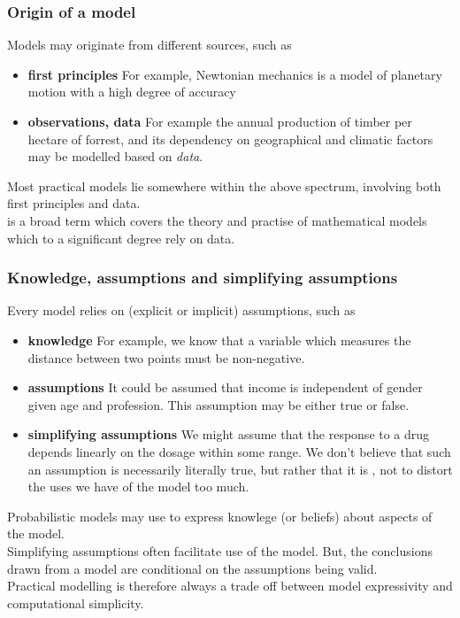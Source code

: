 \begin{frame}
\frametitle{Origin of a model}

Models may originate from different sources, such as
\begin{itemize}
\item {\bf first principles} For example, Newtonian mechanics is a model of planetary motion with a high degree of accuracy
\item {\bf observations, data} For example the annual production of timber per hectare of forrest, and its dependency on geographical and climatic factors may be modelled based on \emph{data}.
\end{itemize}
Most practical models lie somewhere within the  above spectrum, involving both first principles and data.\\[1ex]

 is a broad term which covers the theory and practise of mathematical models which to a significant degree rely on data.  
\end{frame}



\begin{frame}
\frametitle{Knowledge, assumptions and simplifying assumptions}

Every model relies on (explicit or implicit) assumptions, such as
\begin{itemize}
\item {\bf knowledge} For example, we know that a variable which measures the distance between two points must be non-negative.
\item {\bf assumptions} It could be assumed that income is independent of gender given age and profession. This assumption may be either true or false. 
\item {\bf simplifying assumptions} We might assume that the response to a drug depends linearly on the dosage within some range. We don't believe that such an assumption is necessarily literally true, but rather that it is , not to distort the uses we have of the model too much.
\end{itemize}

Probabilistic models may use  to express knowlege (or beliefs) about aspects of the model.\\[1ex] 

Simplifying assumptions often facilitate use of the model. But, the conclusions drawn from a model are conditional on the assumptions being valid.\\[1ex]

Practical modelling is therefore always a trade off between model expressivity  and computational simplicity.
\end{frame}


